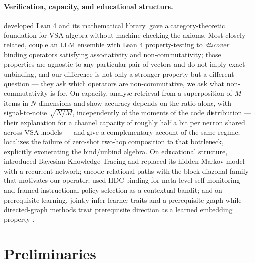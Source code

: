\documentclass[10pt]{article}
\begin{document}
\paragraph{Verification, capacity, and educational structure.} \citet{demoura2021lean4} developed Lean 4 and \citet{mathlib2020} its mathematical library. \citet{shaw2025category} gave a category-theoretic foundation for VSA algebra without machine-checking the axioms. Most closely related, \citet{scott2026avsad} couple an LLM ensemble with Lean 4 property-testing to \emph{discover} binding operators satisfying associativity and non-commutativity; those properties are agnostic to any particular pair of vectors and do not imply exact unbinding, and our difference is not only a stronger property but a different question --- they ask which operators are non-commutative, we ask what non-commutativity is for. On capacity, \citet{frady2017superposition,frady2018theory} analyse retrieval from a superposition of $M$ items in $N$ dimensions and show accuracy depends on the ratio alone, with signal-to-noise $\sqrt{N/M}$, independently of the moments of the code distribution --- their explanation for a channel capacity of roughly half a bit per neuron shared across VSA models --- and \citet{thomas2021hd} give a complementary account of the same regime; \citet{kumar2026holographic} localizes the failure of zero-shot two-hop composition to that bottleneck, explicitly exonerating the bind/unbind algebra. On educational structure, \citet{corbett1994knowledge} introduced Bayesian Knowledge Tracing and \citet{piech2015deep} replaced its hidden Markov model with a recurrent network; \citet{liu2025pathhd} encode relational paths with the block-diagonal family that motivates our operator; \citet{zou2025metacog} used HDC binding for meta-level self-monitoring and \citet{girard2026counterfactual} framed instructional policy selection as a contextual bandit; and on prerequisite learning, \citet{zhou2024psikt} jointly infer learner traits and a prerequisite graph while directed-graph methods treat prerequisite direction as a learned embedding property \citep{qu2024cprp,zhang2025gkrom,zhang2025dgcpl,cheng2026proprl}.


\section{Preliminaries}
\label{sec:prelim}
\end{document}
